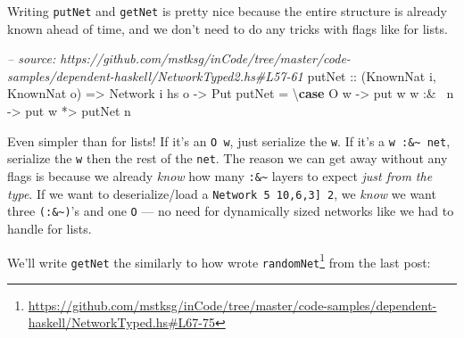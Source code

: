 \documentclass[]{article}
\newenvironment{Shaded}{}{}
\newcommand{\KeywordTok}[1]{\textcolor[rgb]{0.00,0.44,0.13}{\textbf{{#1}}}}
\newcommand{\DataTypeTok}[1]{\textcolor[rgb]{0.56,0.13,0.00}{{#1}}}
\newcommand{\CommentTok}[1]{\textcolor[rgb]{0.38,0.63,0.69}{\textit{{#1}}}}
\newcommand{\OtherTok}[1]{\textcolor[rgb]{0.00,0.44,0.13}{{#1}}}
\newcommand{\FunctionTok}[1]{\textcolor[rgb]{0.02,0.16,0.49}{{#1}}}
\newcommand{\NormalTok}[1]{{#1}}
\renewcommand{\href}[2]{#2\footnote{\url{#1}}}
\begin{document}
Writing \texttt{putNet} and \texttt{getNet} is pretty nice because the entire
structure is already known ahead of time, and we don't need to do any tricks
with flags like for lists.

\begin{Shaded}
\begin{Highlighting}[]
\CommentTok{-- source: https://github.com/mstksg/inCode/tree/master/code-samples/dependent-haskell/NetworkTyped2.hs#L57-61}
\OtherTok{putNet ::} \NormalTok{(}\DataTypeTok{KnownNat} \NormalTok{i, }\DataTypeTok{KnownNat} \NormalTok{o)}
       \OtherTok{=>} \DataTypeTok{Network} \NormalTok{i hs o}
       \OtherTok{->} \DataTypeTok{Put}
\NormalTok{putNet }\FunctionTok{=} \NormalTok{\textbackslash{}}\KeywordTok{case} \DataTypeTok{O} \NormalTok{w     }\OtherTok{->} \NormalTok{put w}
               \NormalTok{w }\FunctionTok{:&~} \NormalTok{n }\OtherTok{->} \NormalTok{put w }\FunctionTok{*>} \NormalTok{putNet n}
\end{Highlighting}
\end{Shaded}

Even simpler than for lists! If it's an \texttt{O\ w}, just serialize the
\texttt{w}. If it's a \texttt{w\ :\&\textasciitilde{}\ net}, serialize the
\texttt{w} then the rest of the \texttt{net}. The reason we can get away without
any flags is because we already \emph{know} how many
\texttt{:\&\textasciitilde{}} layers to expect \emph{just from the type}. If we
want to deserialize/load a
\texttt{Network\ 5\ \textquotesingle{}{[}10,6,3{]}\ 2}, we \emph{know} we want
three \texttt{(:\&\textasciitilde{})}'s and one \texttt{O} --- no need for
dynamically sized networks like we had to handle for lists.

We'll write \texttt{getNet} the similarly to how wrote
\href{https://github.com/mstksg/inCode/tree/master/code-samples/dependent-haskell/NetworkTyped.hs\#L67-75}{\texttt{randomNet}}
from the last post:

\begin{Shaded}
\end{Shaded}
\end{document}

